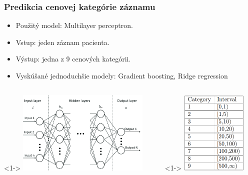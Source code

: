 \documentclass[slovak,10pt]{beamer}
\begin{document}
\begin{frame}
	\frametitle{Predikcia cenovej kategórie záznamu}
	\begin{itemize}
		\item<1> Použitý model: Multilayer perceptron.
		\item<1> Vstup: jeden záznam pacienta.
		\item<1> Výstup: jedna z 9 cenových kategórii.
		\item<1> Vyskúšané jednoduchšie modely: Gradient boosting, Ridge regression
	\end{itemize}
	\begin{columns}[T]%
		\begin{column}{.64\textwidth}<1->%
			\includegraphics[height=4cm]{images/MLP_arch.png}
		\end{column}
		\hfill%
		\begin{column}{.32\textwidth}<1->%
			\includegraphics[height=4cm]{images/mlp_cat.png}
		\end{column}  
	\end{columns}
\end{frame}
\end{document}
